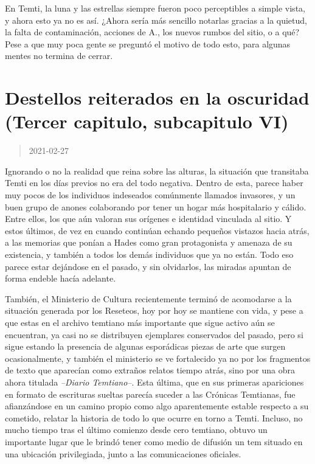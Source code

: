 \documentclass[
  spanish,
]{book}
\begin{document}
En Temti, la luna y las estrellas siempre fueron poco perceptibles a simple vista, y ahora esto ya no es así. ¿Ahora sería más sencillo notarlas gracias a la quietud, la falta de contaminación, acciones de A., los nuevos rumbos del sitio, o a qué? Pese a que muy poca gente se preguntó el motivo de todo esto, para algunas mentes no termina de cerrar.

\hypertarget{destellos-reiterados-en-la-oscuridad-tercer-capitulo-subcapitulo-vi}{%
\section{Destellos reiterados en la oscuridad (Tercer capitulo, subcapitulo VI)}\label{destellos-reiterados-en-la-oscuridad-tercer-capitulo-subcapitulo-vi}}

\begin{quote}
2021-02-27
\end{quote}

Ignorando o no la realidad que reina sobre las alturas, la situación que transitaba Temti en los días previos no era del todo negativa. Dentro de esta, parece haber muy pocos de los individuos indeseados comúnmente llamados invasores, y un buen grupo de anones colaborando por tener un hogar más hospitalario y cálido. Entre ellos, los que aún valoran sus orígenes e identidad vinculada al sitio. Y estos últimos, de vez en cuando continúan echando pequeños vistazos hacia atrás, a las memorias que ponían a Hades como gran protagonista y amenaza de su existencia, y también a todos los demás individuos que ya no están. Todo eso parece estar dejándose en el pasado, y sin olvidarlos, las miradas apuntan de forma endeble hacía adelante.

También, el Ministerio de Cultura recientemente terminó de acomodarse a la situación generada por los Reseteos, hoy por hoy se mantiene con vida, y pese a que estas en el archivo temtiano más importante que sigue activo aún se encuentran, ya casi no se distribuyen ejemplares conservados del pasado, pero si sigue estando la presencia de algunas esporádicas piezas de arte que surgen ocasionalmente, y también el ministerio se ve fortalecido ya no por los fragmentos de texto que aparecían como extraños relatos tiempo atrás, sino por una obra ahora titulada \emph{--Diario Temtiano--}. Esta última, que en sus primeras apariciones en formato de escrituras sueltas parecía suceder a las Crónicas Temtianas, fue afianzándose en un camino propio como algo aparentemente estable respecto a su cometido, relatar la historia de todo lo que ocurre en torno a Temti. Incluso, no mucho tiempo tras el último comienzo desde cero temtiano, obtuvo un importante lugar que le brindó tener como medio de difusión un tem situado en una ubicación privilegiada, junto a las comunicaciones oficiales.
\end{document}
